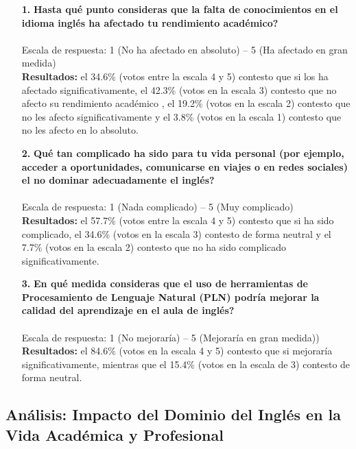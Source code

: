 \begin{enumerate}
\item[\textbf{1.}] \textbf{\textquestiondown Hasta qué punto consideras que la falta de conocimientos en el idioma inglés ha afectado tu rendimiento académico?}\\\\
Escala de respuesta: 1 (No ha afectado en absoluto) -- 5 (Ha afectado en gran medida)\\ 

\textbf{Resultados: } el 34.6\%  (votos entre la escala 4 y 5) contesto que si los ha afectado significativamente, el 42.3\% (votos en la escala 3) contesto que  no afecto su rendimiento académico , el 19.2\% (votos en la escala 2) contesto que no les afecto significativamente y el 3.8\% (votos en la escala 1) contesto que no les afecto en lo absoluto.
\\
\item[\textbf{2.}] \textbf{\textquestiondown Qué tan complicado ha sido para tu vida personal (por ejemplo, acceder a oportunidades, comunicarse en viajes o en redes sociales) el no dominar adecuadamente el inglés?}\\\\
Escala de respuesta: 1 (Nada complicado) -- 5 (Muy complicado)\\

\textbf{Resultados: } el 57.7\% (votos entre la escala 4 y 5) contesto que si ha sido complicado, el 34.6\% (votos en la escala 3) contesto de forma neutral y el 7.7\% (votos en la escala 2) contesto que no ha sido complicado significativamente.
\\
\item[\textbf{3.}] \textbf{\textquestiondown En qué medida consideras que el uso de herramientas de Procesamiento de Lenguaje Natural (PLN) podría mejorar la calidad del aprendizaje en el aula de inglés?}\\\\
Escala de respuesta: 1 (No mejoraría) -- 5 (Mejoraría en gran medida))\\

\textbf{Resultados: } el 84.6\% (votos en la escala 4 y 5) contesto que si mejoraría significativamente, mientras que el 15.4\% (votos en la escala de 3) contesto de forma neutral.
\\
\end{enumerate}

\subsection{Análisis: Impacto del Dominio del Inglés en la Vida Académica y Profesional}


